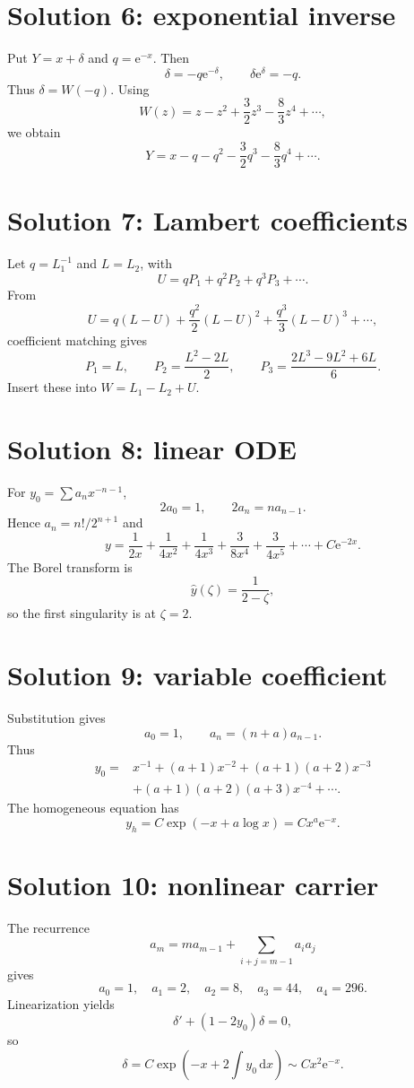 \documentclass[11pt,oneside,openany]{book}
\newcommand{\e}{\mathrm{e}}
\newcommand{\dd}{\,\mathrm{d}}
\theoremstyle{plain}
\theoremstyle{definition}
\theoremstyle{remark}
\begin{document}
\section*{Solution 6: exponential inverse}
Put $Y=x+\delta$ and $q=\e^{-x}$. Then
\[
  \delta=-q\e^{-\delta},
  \qquad\delta\e^\delta=-q.
\]
Thus $\delta=W(-q)$. Using
\[
  W(z)=z-z^2+\frac32z^3-\frac83z^4+\cdots,
\]
we obtain
\[
\boxed{
  Y=x-q-q^2-\frac32q^3-\frac83q^4+\cdots.}
\]

\section*{Solution 7: Lambert coefficients}
Let $q=L_1^{-1}$ and $L=L_2$, with
\[
  U=qP_1+q^2P_2+q^3P_3+\cdots.
\]
From
\[
  U=q(L-U)+\frac{q^2}{2}(L-U)^2
  +\frac{q^3}{3}(L-U)^3+\cdots,
\]
coefficient matching gives
\[
  P_1=L,
  \qquad P_2=\frac{L^2-2L}{2},
  \qquad P_3=\frac{2L^3-9L^2+6L}{6}.
\]
Insert these into $W=L_1-L_2+U$.

\section*{Solution 8: linear ODE}
For $y_0=\sum a_nx^{-n-1}$,
\[
  2a_0=1,
  \qquad2a_n=na_{n-1}.
\]
Hence $a_n=n!/2^{n+1}$ and
\[
\boxed{
  y=\frac1{2x}+\frac1{4x^2}+\frac1{4x^3}
  +\frac3{8x^4}+\frac3{4x^5}+\cdots+C\e^{-2x}.}
\]
The Borel transform is
\[
  \widehat y(\zeta)=\frac1{2-\zeta},
\]
so the first singularity is at $\zeta=2$.

\section*{Solution 9: variable coefficient}
Substitution gives
\[
  a_0=1,
  \qquad a_n=(n+a)a_{n-1}.
\]
Thus
\[
\begin{aligned}
y_0={}&x^{-1}+(a+1)x^{-2}
 +(a+1)(a+2)x^{-3}\\
&+(a+1)(a+2)(a+3)x^{-4}+\cdots.
\end{aligned}
\]
The homogeneous equation has
\[
  y_h=C\exp(-x+a\log x)=Cx^a\e^{-x}.
\]

\section*{Solution 10: nonlinear carrier}
The recurrence
\[
  a_m=ma_{m-1}+\sum_{i+j=m-1}a_ia_j
\]
gives
\[
  a_0=1,
  \quad a_1=2,
  \quad a_2=8,
  \quad a_3=44,
  \quad a_4=296.
\]
Linearization yields
\[
  \delta'+(1-2y_0)\delta=0,
\]
so
\[
  \delta=C\exp\left(-x+2\int y_0\dd x\right)
  \sim Cx^2\e^{-x}.
\]
\end{document}

